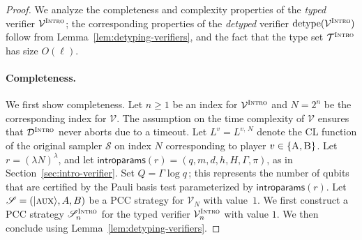 \documentclass[11pt]{article}
\theoremstyle{definition}
\newcommand{\ket}[1]{|#1\rangle}
\newcommand{\sampler}{\mathcal{S}}
\newcommand{\decider}{\mathcal{D}}
\newcommand{\verifier}{\mathcal{V}}
\newcommand{\strategy}{\mathscr{S}}
\newcommand{\detype}{\mathrm{detype}}
\newcommand{\type}{\mathcal{T}}
\newcommand{\gamestyle}[1]{\ensuremath{\textsc{#1}}\xspace}
\newcommand{\intro}{\gamestyle{Intro}}
\newcommand{\labelstyle}[1]{\ensuremath{\textsc{#1}}\xspace}
\newcommand{\aux}{\labelstyle{aux}}
\newcommand{\trole}{\ensuremath{v}} %
\newcommand{\alice}{\labelstyle{A}}
\newcommand{\bob}{\labelstyle{B}}
\newcommand{\AB}{\{\alice, \bob\}}
\newcommand{\introparams}{\mathsf{introparams}}
\begin{document}
\begin{proof} 
  We analyze the completeness and complexity properties of the \emph{typed}
  verifier $\verifier^\intro$; the corresponding properties of the
  \emph{detyped} verifier $\detype(\verifier^\intro)$ follow from
  Lemma~\ref{lem:detyping-verifiers}, and the fact that the type set
  $\type^\intro$ has size $O(\ell)$.

  \paragraph{Completeness.}
  We first show completeness.
  Let $n\geq 1$ be an index for $\verifier^\intro$ and $N = 2^n$ be the
  corresponding index for $\verifier$.
  The assumption on the time complexity of $\verifier$ ensures that
  $\decider^\intro$ never aborts due to a timeout.
	Let $L^\trole = L^{\trole,\, N}$ denote the CL function of the original
  sampler $\sampler$ on index $N$ corresponding to player $\trole \in \AB$.
  Let $r = (\lambda N)^\lambda$, and let $\introparams(r) =
  (q,m,d,h,H,\Gamma,\pi)$, as in Section~\ref{sec:intro-verifier}.
  Set $Q = \Gamma \log q$\,; this represents the number of qubits that are
  certified by the Pauli basis test parameterized by $\introparams(r)$.
  Let $\strategy = (\ket{\aux}, A, B)$ be a PCC strategy for $\verifier_N$ with
  value~$1$.
  We first construct a PCC strategy $\strategy^\intro_n$ for the typed verifier
  $\verifier^\intro_n$ with value $1$.
  We then conclude using Lemma~\ref{lem:detyping-verifiers}.


\end{proof}
\end{document}
